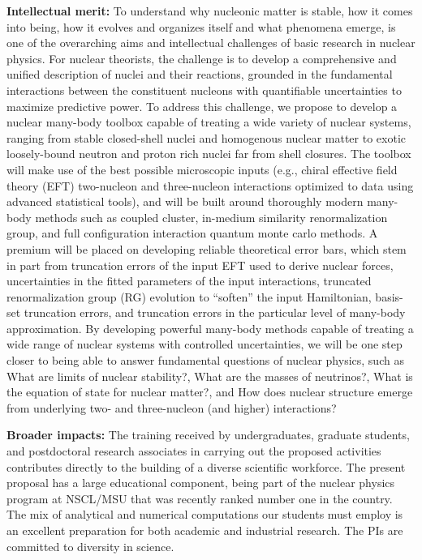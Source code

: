 {\bf Intellectual merit:} To understand why nucleonic matter is
stable, how it comes into being, how it evolves and organizes itself
and what phenomena emerge, is one of the overarching aims and
intellectual challenges of basic research in nuclear physics. For
nuclear theorists, the challenge is to develop a comprehensive and
unified description of nuclei and their reactions, grounded in the
fundamental interactions between the constituent nucleons with
quantifiable uncertainties to maximize predictive power. To address
this challenge, we propose to develop a nuclear many-body toolbox
capable of treating a wide variety of nuclear systems, ranging from
stable closed-shell nuclei and homogenous nuclear matter to exotic
loosely-bound neutron and proton rich nuclei far from shell
closures. The toolbox will make use of the best possible microscopic
inputs (e.g., chiral effective field theory (EFT) two-nucleon and three-nucleon
interactions optimized to data using advanced statistical tools), and
will be built around thoroughly modern many-body methods such as
coupled cluster, in-medium similarity renormalization group, and full
configuration interaction quantum monte carlo methods.  A premium will
be placed on developing reliable theoretical error bars, which stem in
part from truncation errors of the input EFT used to derive nuclear
forces, uncertainties in the fitted parameters of the input
interactions, truncated renormalization group (RG) evolution to
``soften'' the input Hamiltonian, basis-set truncation errors, and
truncation errors in the particular level of many-body approximation.
By developing powerful many-body methods capable of treating a wide
range of nuclear systems with controlled uncertainties, we will be one
step closer to being able to answer fundamental questions of nuclear
physics, such as What are limits of nuclear stability?, What are the
masses of neutrinos?, What is the equation of state for nuclear
matter?, and How does nuclear structure emerge from underlying two-
and three-nucleon (and higher) interactions?

{\bf Broader impacts:} The training received by undergraduates,
graduate students, and postdoctoral research associates in carrying
out the proposed activities contributes directly to the building of a
diverse scientific workforce. The present proposal has a large
educational component, being part of the nuclear physics program at
NSCL/MSU that was recently ranked number one in the country. The mix
of analytical and numerical computations our students must employ is
an excellent preparation for both academic and industrial research. The
PIs are committed to diversity in science.


